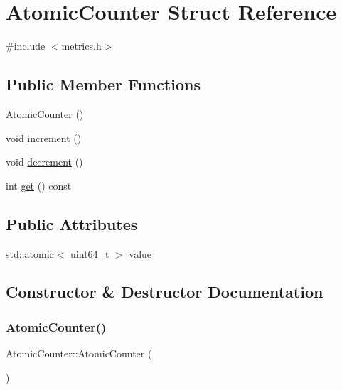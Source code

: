 \hypertarget{struct_atomic_counter}{}\section{Atomic\+Counter Struct Reference}
\label{struct_atomic_counter}


{\ttfamily \#include $<$metrics.\+h$>$}

\subsection*{Public Member Functions}
\begin{DoxyCompactItemize}
\item 
\mbox{\hyperlink{struct_atomic_counter_ae9e4b35b5c15a127d83d12803fbfa9ce}{Atomic\+Counter}} ()
\item 
void \mbox{\hyperlink{struct_atomic_counter_a00533de14994ef96dcfbc3688e05df65}{increment}} ()
\item 
void \mbox{\hyperlink{struct_atomic_counter_a9ec1bdb7a082960b0d8e53f070275e4a}{decrement}} ()
\item 
int \mbox{\hyperlink{struct_atomic_counter_a9533a89dbcf50da59972e3abd09a29ef}{get}} () const
\end{DoxyCompactItemize}
\subsection*{Public Attributes}
\begin{DoxyCompactItemize}
\item 
std\+::atomic$<$ uint64\+\_\+t $>$ \mbox{\hyperlink{struct_atomic_counter_abf5b94fde7476b9090611238b24e9bf6}{value}}
\end{DoxyCompactItemize}


\subsection{Constructor \& Destructor Documentation}
\mbox{\label{struct_atomic_counter_ae9e4b35b5c15a127d83d12803fbfa9ce}} 
\subsubsection{\texorpdfstring{Atomic\+Counter()}{AtomicCounter()}}
{\footnotesize\ttfamily Atomic\+Counter\+::\+Atomic\+Counter (\begin{DoxyParamCaption}{ }\end{DoxyParamCaption})\hspace{0.3cm}{\ttfamily [inline]}}



